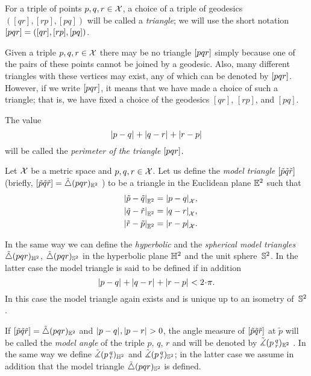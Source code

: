 For a triple of points $p,q,r\in \mathcal{X}$, a choice of a triple of geodesics $([q r], [r p], [p q])$ will be called a \emph{triangle}; we will use the short notation 
$[pqr]=([q r], [r p], [p q])$\index{$\trig {{*}}{{*}}{{*}}$}.

Given a triple $p,q,r\in \mathcal{X}$ there may be no triangle 
$[pqr]$ simply because one of the pairs of these points cannot be joined by a geodesic.
Also, many different triangles with these vertices may exist, any of which can be denoted by $[pqr]$.
However, if we write $[pqr]$, it means that we have made a choice of such a triangle; 
that is, we have  fixed a choice of the geodesics $[q r]$, $[r p]$, and $[p q]$.

The value 
\[\dist{p}{q}{}+\dist{q}{r}{}+\dist{r}{p}{}\]
will be called the {}\emph{perimeter of the triangle} $[pqr]$.

Let $\mathcal{X}$ be a metric space and 
$p,q,r\in \mathcal{X}$. 
Let us define the \emph{model triangle} $[\tilde p\tilde q\tilde r]$ 
(briefly, 
$[\tilde p\tilde q\tilde r]=\tilde\triangle(p q r)_{\mathbb{E}^2}$%
) to be a triangle in the Euclidean plane $\mathbb{E}^2$ such that
\begin{align*}\dist{\tilde p}{\tilde q}{\EE^2}&=\dist{p}{q}{\spc{X}},
\\
\quad\dist{\tilde q}{\tilde r}{\EE^2}&=\dist{q}{r}{\spc{X}},
\\
\quad\dist{\tilde r}{\tilde p}{\EE^2}&=\dist{r}{p}{\spc{X}}.
\end{align*}

In the same way we can define the \emph{hyperbolic} and the \emph{spherical model triangles} $\tilde\triangle(p q r)_{\mathbb{H}^2}$, $\tilde\triangle(p q r)_{\mathbb{S}^2}$
in the hyperbolic plane $\mathbb{H}^2$ and the unit sphere~$\mathbb{S}^2$.
In the latter case the model triangle is said to be defined if in addition
\[\dist{p}{q}{}+\dist{q}{r}{}+\dist{r}{p}{}< 2\cdot\pi.\]
In this case the model triangle again exists and is unique up to an isometry of~$\mathbb{S}^2$.

If 
$[\tilde p\tilde q\tilde r]=\tilde\triangle(p q r)_{\mathbb{E}^2}$ 
and $\dist{p}{q}{},\dist{p}{r}{}>0$, 
the angle measure of 
$[\tilde p\tilde q\tilde r]$ at $\tilde p$ 
will be called the \emph{model angle} of the triple $p$, $q$, $r$ and will be denoted by
$\tilde\measuredangle(p\,{}^{q}_{r})_{\mathbb{E}^2}$%
\index{$\tangle$!$\angk{{*}}{{*}}{{*}}$}.
In the same way we define $\tilde\measuredangle(p\,{}^{q}_{r})_{\mathbb{H}^2}$ and $\tilde\measuredangle(p\,{}^{q}_{r})_{\mathbb{S}^2}$;
in the latter case  we assume in addition that the model triangle $\tilde\triangle(p q r)_{\mathbb{S}^2}$ is defined.

